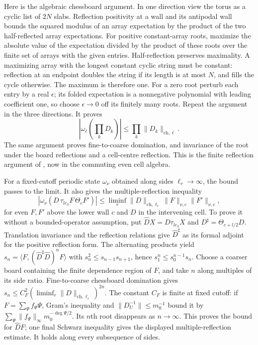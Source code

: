 \documentclass[11pt,letterpaper,reqno]{amsart}
\theoremstyle{definition}
\theoremstyle{remark}
\begin{document}
Here is the algebraic chessboard argument.  In
one direction view the torus as a cyclic list
of $2N$ slabs.  Reflection positivity at a wall
and its antipodal wall bounds the squared modulus of
an array expectation by the product of the
two half-reflected array expectations.  For
positive constant-array roots, maximize the absolute value of the
expectation divided by the product of these
roots over the finite set of arrays with the
given entries.  Half-reflection preserves
maximality.  A maximizing array with the
longest constant cyclic string must be
constant: reflection at an endpoint doubles
the string if its length is at most $N$,
and fills the cycle otherwise.  The maximum
is therefore one.  For a zero root perturb
each entry by a real $\epsilon$; its folded
expectation is a nonnegative polynomial
with leading coefficient one, so choose
$\epsilon\to0$ off its finitely many roots.
Repeat the argument in the three directions.
It proves
\[
 |\omega_\ell(\prod_kD_k)|
                 \le\prod_k\|D_k\|_{\mathrm{ch},\ell}.
\]
The same argument proves fine-to-coarse
domination, and invariance of the root under
the board reflections and a cell-centre
reflection.  This is the finite reflection
argument of \cite[Prop.~5.86]{YMM1},
now in the commuting even cell algebra.

For a fixed-cutoff periodic state $\omega_\nu$
obtained along sides $\ell_r\to\infty$, the
bound passes to the limit.  It also gives
the multiple-reflection inequality
\[
 |\omega_\nu(D\,\tau_{le_3}F\,\Theta_cF')|
 \le\liminf_r\|D\|_{\mathrm{ch},\ell_r}
                        \|F\|_{\nu,c}\|F'\|_{\nu,c},
\]
for even $F,F'$ above the lower wall $c$ and
$D$ in the intervening cell.  To prove it
without a bounded-operator assumption, put
$\widehat DX=D\tau_{le_3}X$ and
$D^\sharp=\Theta_{c+l/2}D$.
Translation invariance and the reflection
relations give $\widehat D^\sharp$ as its
formal adjoint for the positive reflection
form.  The alternating products yield
$s_n=\langle F,(\widehat D^\sharp\widehat D)^nF\rangle$
with $s_n^2\le s_{n-1}s_{n+1}$, hence
$s_1^n\le s_0^{n-1}s_n$.
Choose a coarser board containing the finite
dependence region of $F$, and take $n$ along
multiples of its side ratio.  Fine-to-coarse
chessboard domination gives
$s_n\le C_F^2(\liminf_r\|D\|_{\mathrm{ch},\ell_r})^{2n}$.
The constant $C_F$ is finite at fixed cutoff:
if $F=\sum_\Psi f_\Psi\Psi$, Gram's inequality
and $\|D_U^{-1}\|\le m_0^{-1}$ bound it by
$\sum_\Psi\|f_\Psi\|_\infty m_0^{-\deg\Psi/2}$.
Its $n$th root disappears as $n\to\infty$.
This proves the bound for $\widehat DF$;
one final Schwarz inequality gives the
displayed multiple-reflection estimate.
It holds along every subsequence of sides.
\end{document}
